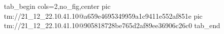  
 
 
 
 

\qqSecOrig


\ifcmt
  tab_begin cols=2,no_fig,center
    pic tm://21_12_22.10.41.10@a659e4695349959a1c9411e552af851e
    pic tm://21_12_22.10.41.10@905818728be765d2af89ee36906c26c0
  tab_end
\fi

